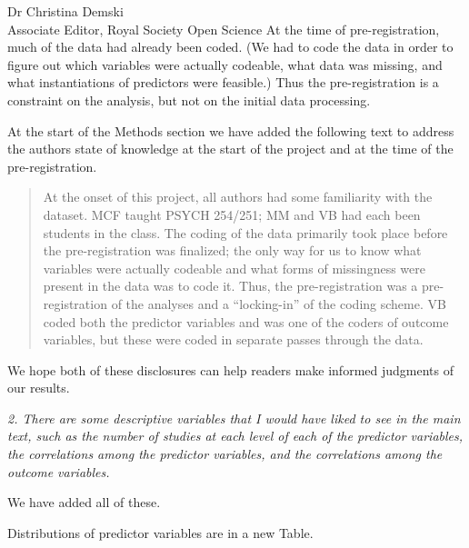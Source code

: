\documentclass{stanfordletter}
\newcommand{\theysaid}[1]{\begin{leftbar} \noindent 
		\textsl{ #1}\end{leftbar}}
\newcommand{\revised}[1]{\begin{quote}	#1 \end{quote}}
\begin{document}
\begin{letter}{Dr Christina Demski \\ Associate Editor, Royal Society Open Science}
          At the time of pre-registration, much of the data had already been coded. (We had to code the data in order to figure out which variables were actually codeable, what data was missing, and what instantiations of predictors were feasible.)  Thus the pre-registration is a constraint on the analysis, but not on the initial data processing. 
          
          At the start of the Methods section we have added the following text to address the authors state of knowledge at the start of the project and at the time of the pre-registration. 
          
          \revised{At the onset of this project, all authors had some familiarity with the dataset. MCF taught PSYCH 254/251; MM and VB had each been students in the class. The coding of the data primarily took place before the pre-registration was finalized; the only way for us to know what variables were actually codeable and what forms of missingness were present in the data was to code it. Thus, the pre-registration was a pre-registration of the analyses and a ``locking-in'' of the coding scheme. VB coded both the predictor variables and was one of the coders of outcome variables, but these were coded in separate passes through the data.}
          
          We hope both of these disclosures can help readers make informed judgments of our results. 
          
          
          \theysaid{
          	2. There are some descriptive variables that I would have liked to see in the main text, such as the number of studies at each level of each of the predictor variables, the correlations among the predictor variables, and the correlations among the outcome variables.
          }
          
          We have added all of these.
          
          Distributions of predictor variables are in a new Table. 
          

\end{letter}
\end{document}

